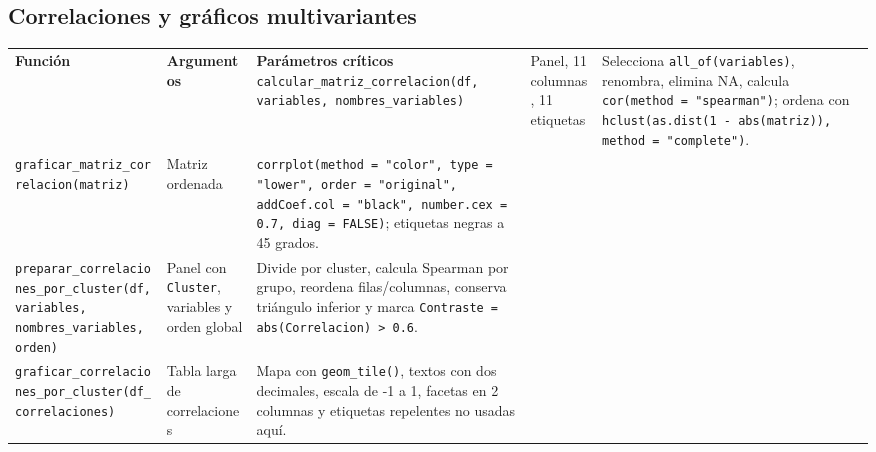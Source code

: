 \documentclass[10pt,a4paper]{article}
\newcommand{\code}[1]{\texttt{\small #1}}
\begin{document}
\subsection{Correlaciones y gráficos multivariantes}
\begin{longtable}{p{}p{}p{}}
\toprule\textbf{Función} & \textbf{Argumentos} & \textbf{Parámetros críticos}\
\midrule\endhead
\code{calcular\_matriz\_correlacion(df, variables, nombres\_variables)} & Panel, 11 columnas, 11 etiquetas & Selecciona \code{all\_of(variables)}, renombra, elimina NA, calcula \code{cor(method = "spearman")}; ordena con \code{hclust(as.dist(1 - abs(matriz)), method = "complete")}.\\
\code{graficar\_matriz\_correlacion(matriz)} & Matriz ordenada & \code{corrplot(method = "color", type = "lower", order = "original", addCoef.col = "black", number.cex = 0.7, diag = FALSE)}; etiquetas negras a 45 grados.\\
\code{preparar\_correlaciones\_por\_cluster(df, variables, nombres\_variables, orden)} & Panel con \code{Cluster}, variables y orden global & Divide por cluster, calcula Spearman por grupo, reordena filas/columnas, conserva triángulo inferior y marca \code{Contraste = abs(Correlacion) > 0.6}.\\
\code{graficar\_correlaciones\_por\_cluster(df\_correlaciones)} & Tabla larga de correlaciones & Mapa con \code{geom\_tile()}, textos con dos decimales, escala de -1 a 1, facetas en 2 columnas y etiquetas repelentes no usadas aquí.\\
\bottomrule\end{longtable}
\end{document}
